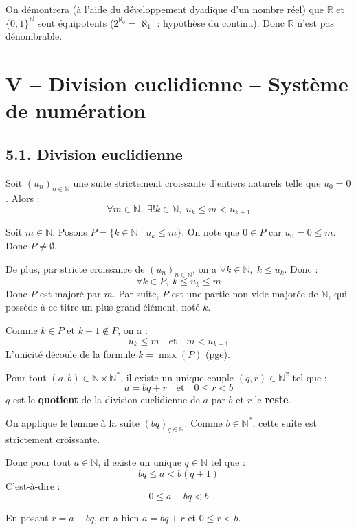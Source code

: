 \documentclass[a4paper,11pt]{article}
\newcommand{\R}{\mathbb{R}}
\newcommand{\N}{\mathbb{N}}
\newcommand{\mot}[1]{\textcolor{bordeaux}{\textbf{#1}}}
\begin{document}
On démontrera (à l'aide du développement dyadique d'un nombre réel) que $\R$ et $\{0,1\}^{\N}$ sont équipotents ($2^{\aleph_0} = \aleph_1$ : hypothèse du continu). Donc $\R$ n'est pas dénombrable.

\newpage
\section{V -- Division euclidienne -- Système de numération}

\subsection{5.1. Division euclidienne}

\begin{lemme}
Soit $(u_n)_{n \in \N}$ une suite strictement croissante d'entiers naturels telle que $u_0 = 0$. Alors :
$$ \forall m \in \N, \; \exists ! k \in \N, \; u_k \le m < u_{k+1} $$
\end{lemme}

\begin{demonstration}
Soit $m \in \N$. Posons $P = \{k \in \N \mid u_k \le m\}$. 
On note que $0 \in P$ car $u_0 = 0 \le m$. Donc $P \neq \emptyset$. 

De plus, par stricte croissance de $(u_n)_{n \in \N}$, on a $\forall k \in \N, \; k \le u_k$. Donc :
$$ \forall k \in P, \; k \le u_k \le m $$
Donc $P$ est majoré par $m$. Par suite, $P$ est une partie non vide majorée de $\N$, qui possède à ce titre un plus grand élément, noté $k$.

Comme $k \in P$ et $k+1 \notin P$, on a :
$$ u_k \le m \quad \text{et} \quad m < u_{k+1} $$
L'unicité découle de la formule $k = \max(P)$ (pge).
\end{demonstration}

\begin{theoreme}
Pour tout $(a,b) \in \N \times \N^*$, il existe un unique couple $(q,r) \in \N^2$ tel que :
$$ a = bq + r \quad \text{et} \quad 0 \le r < b $$
$q$ est le \mot{quotient} de la division euclidienne de $a$ par $b$ et $r$ le \mot{reste}.
\end{theoreme}

\begin{demonstration}
On applique le lemme à la suite $(bq)_{q \in \N}$. Comme $b \in \N^*$, cette suite est strictement croissante. 

Donc pour tout $a \in \N$, il existe un unique $q \in \N$ tel que :
$$ bq \le a < b(q+1) $$
C'est-à-dire :
$$ 0 \le a - bq < b $$

En posant $r = a - bq$, on a bien $a = bq + r$ et $0 \le r < b$.
\end{demonstration}
\end{document}
